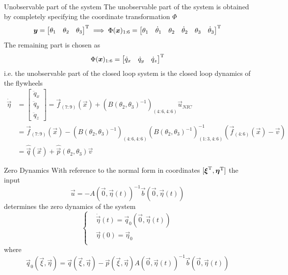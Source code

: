 \begin{frame}[shrink=10]{Unobservable part of the system \cubli}
  The \alert{unobservable part} of the system is obtained by completely specifying
  the coordinate transformation $\Phi$
  \[
  \boldsymbol{y} =
  \begin{bmatrix}
    \theta_1 &
    \theta_2 &
    \theta_3
  \end{bmatrix}^{\mathrm{T}}
  \implies
  \Phi(\boldsymbol{x})_{1:6} =
  \begin{bmatrix}
    \theta_1 & \dot{\theta}_1 &  \theta_2 & \dot{\theta}_2 &
    \theta_3 & \dot{\theta}_3
  \end{bmatrix}^{\mathrm{T}}
  \]
  The remaining part is chosen as
  \[
  \Phi(\boldsymbol{x})_{1:6} =
  \begin{bmatrix}
    \dot{q}_x & \dot{q}_y & \dot{q}_z
  \end{bmatrix}^{\mathrm{T}}
  \]
  i.e. the unobservable part of the closed loop system is the closed loop dynamics of the
  flywheels
  \[
  \begin{split}
    \dot{\vec{\eta}} &=
    \begin{bmatrix}
      \ddot{q}_{x}\\
      \ddot{q}_{y}\\
      \ddot{q}_{z}
    \end{bmatrix}
    = \vec{f}_{(7:9)}(\vec{x}) + \left(B(\theta_2,\theta_3) ^ {-1}\right)_{(4:6, 4:6)} \vec{u}_{NIC}\\
    &=\vec{f}_{(7:9)}(\vec{x}) - \left(B(\theta_2,\theta_3) ^ {-1}\right)_{(4:6, 4:6)}
    \left(B(\theta_2,\theta_3) ^ {-1}\right)_{(1:3, 4:6)}^{-1}
    (\vec{f}_{(4:6)}(\vec{x}) - \vec{v})\\
    &=\hat{\vec{q}}(\vec{x}) + \hat{\vec{p}}(\theta_{2},\theta_{3})\vec{v}
  \end{split}
  \]
\end{frame}

\begin{frame}{Zero Dynamics \theory}
  With reference to the normal form in coordinates $[\boldsymbol{\xi}^{\mathrm{T}},\boldsymbol{\eta}^{\mathrm{T}}]$
  the input 
  \[
  \vec{u} = -A(\vec{0},\vec{\eta}(t))^{-1} \vec{b}(\vec{0},\vec{\eta}(t))
  \]
  determines the \alert{zero dynamics} of the system
  \[
  \begin{cases}
    &\dot{\vec{\eta}}(t) = \vec{q}_{0}(\vec{0},\vec{\eta}(t))\\
    &\vec{\eta}(0) = \vec{\eta}_{0}\\
  \end{cases}
  \]
  where
  \[
  \vec{q}_{0}(\vec{\xi},\vec{\eta}) = \vec{q}(\vec{\xi},\vec{\eta}) - \vec{p}
  (\vec{\xi},\vec{\eta})A(\vec{0},\vec{\eta}(t))^{-1} \vec{b}(\vec{0},\vec{\eta}(t))
  \]
\end{frame}

